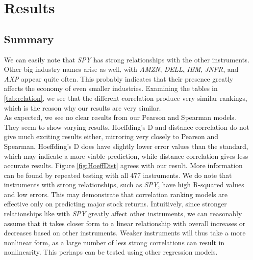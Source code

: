 \documentclass[10pt]{siamltex}
\begin{document}
\vspace*{\fill}
\newpage


\section{Results}  \label{sec:conclusion}

\subsection{Summary}

 We can easily note that \textit{SPY} has strong relationships with the other instruments. Other big industry names arise as well, with \textit{AMZN}, \textit{DELL}, \textit{IBM}, \textit{JNPR}, and \textit{AXP} appear quite often. This probably indicates that their presence greatly affects the economy of even smaller industries. Examining the tables in \ref{tab:relation}, we see that the different correlation produce very similar rankings, which is the reason why our results are very similar.  \vspace{2mm} \\
As expected, we see no clear results from our Pearson and Spearman models. They seem to show varying results. Hoeffding's D and distance correlation do not give much exciting results either, mirroring very closely to Pearson and Spearman. Hoeffding's D does have slightly lower error values than the standard, which may indicate a more viable prediction, while distance correlation gives less accurate results. Figure \ref{fig:HoeffDist} agrees with our result. More information can be found by repeated testing with all 477 instruments. We do note that instruments with strong relationships, such as \textit{SPY}, have high R-squared values and low errors. This may demonstrate that correlation ranking models are effective only on predicting major stock returns. Intuitively, since stronger relationships like with \textit{SPY} greatly affect other instruments, we can reasonably assume that it takes closer form to a linear relationship with overall increases or decreases based on other instruments. Weaker instruments will thus take a more nonlinear form, as a large number of less strong correlations can result in nonlinearity. This perhaps can be tested using other regression models.
\end{document}
